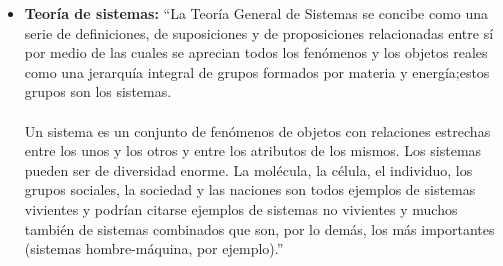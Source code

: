 \begin{itemize}
    \item \textbf{Teoría de sistemas:} “La Teoría General de Sistemas se concibe como una serie de definiciones, de suposiciones y de proposiciones relacionadas entre sí por medio de las cuales se aprecian todos los fenómenos y los objetos reales como una jerarquía integral de grupos formados por materia y energía;estos grupos son los sistemas.
     \\ \\
Un sistema es un conjunto de fenómenos de objetos con relaciones estrechas entre los unos y los otros y entre los atributos de los mismos. Los sistemas pueden ser de diversidad enorme. La molécula, la célula, el individuo, los grupos sociales, la sociedad y las naciones son todos ejemplos de sistemas vivientes y podrían citarse ejemplos de sistemas no vivientes y muchos también de sistemas combinados que son, por lo demás, los más importantes (sistemas hombre-máquina, por ejemplo).”\cite{i}


\end{itemize}

